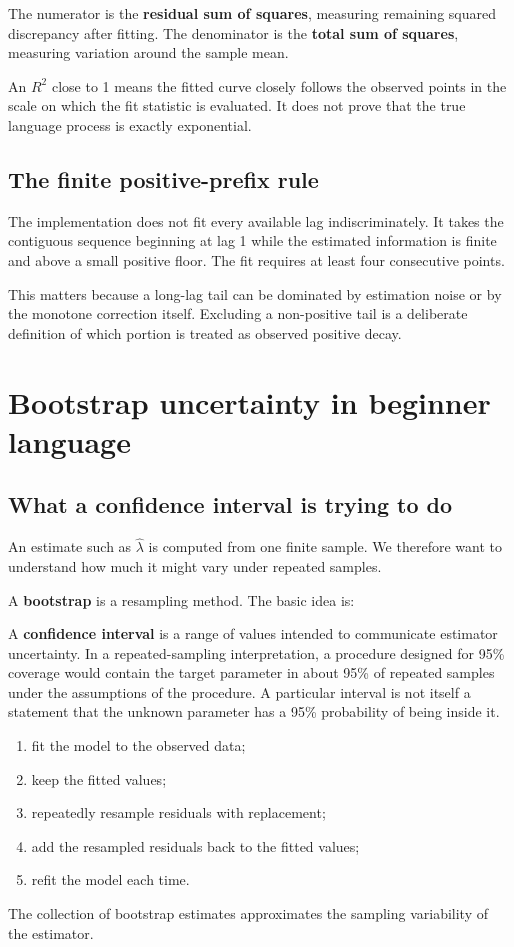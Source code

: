 \documentclass[11pt]{article}
\begin{document}
The numerator is the \textbf{residual sum of squares}, measuring remaining squared discrepancy after fitting. The denominator is the \textbf{total sum of squares}, measuring variation around the sample mean.

An $R^2$ close to 1 means the fitted curve closely follows the observed points in the scale on which the fit statistic is evaluated. It does not prove that the true language process is exactly exponential.

\subsection{The finite positive-prefix rule}
The implementation does not fit every available lag indiscriminately. It takes the contiguous sequence beginning at lag 1 while the estimated information is finite and above a small positive floor. The fit requires at least four consecutive points.

This matters because a long-lag tail can be dominated by estimation noise or by the monotone correction itself. Excluding a non-positive tail is a deliberate definition of which portion is treated as observed positive decay.

\newpage
\section{Bootstrap uncertainty in beginner language}

\subsection{What a confidence interval is trying to do}
An estimate such as $\hat\lambda$ is computed from one finite sample. We therefore want to understand how much it might vary under repeated samples.

A \textbf{bootstrap} is a resampling method. The basic idea is:

A \textbf{confidence interval} is a range of values intended to communicate estimator uncertainty. In a repeated-sampling interpretation, a procedure designed for 95\% coverage would contain the target parameter in about 95\% of repeated samples under the assumptions of the procedure. A particular interval is not itself a statement that the unknown parameter has a 95\% probability of being inside it.
\begin{enumerate}
\item fit the model to the observed data;
\item keep the fitted values;
\item repeatedly resample residuals with replacement;
\item add the resampled residuals back to the fitted values;
\item refit the model each time.
\end{enumerate}
The collection of bootstrap estimates approximates the sampling variability of the estimator.
\end{document}

